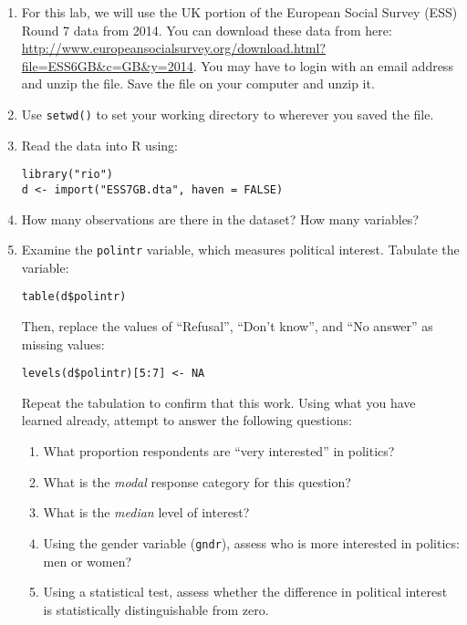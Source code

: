 \documentclass[a4paper,12pt]{article}
\begin{document}
\begin{enumerate}
\item For this lab, we will use the UK portion of the European Social Survey (ESS) Round 7 data from 2014. You can download these data from here: \url{http://www.europeansocialsurvey.org/download.html?file=ESS6GB&c=GB&y=2014}. You may have to login with an email address and unzip the file. Save the file on your computer and unzip it.

\item Use \texttt{setwd()} to set your working directory to wherever you saved the file.

\item Read the data into R using: 

\begin{verbatim}
library("rio")
d <- import("ESS7GB.dta", haven = FALSE)
\end{verbatim}

\item How many observations are there in the dataset? How many variables?

\item Examine the \texttt{polintr} variable, which measures political interest. Tabulate the variable:

\begin{verbatim}
table(d$polintr)
\end{verbatim}

\noindent Then, replace the values of ``Refusal'', ``Don't know'', and ``No answer'' as missing values: 

\begin{verbatim}
levels(d$polintr)[5:7] <- NA
\end{verbatim}

\noindent Repeat the tabulation to confirm that this work. Using what you have learned already, attempt to answer the following questions:

\begin{enumerate}
\item What proportion respondents are ``very interested'' in politics?	
\item What is the \textit{modal} response category for this question?
\item What is the \textit{median} level of interest?
\item Using the gender variable (\texttt{gndr}), assess who is more interested in politics: men or women?
\item Using a statistical test, assess whether the difference in political interest is statistically distinguishable from zero.
\end{enumerate}


\end{enumerate}
\end{document}

